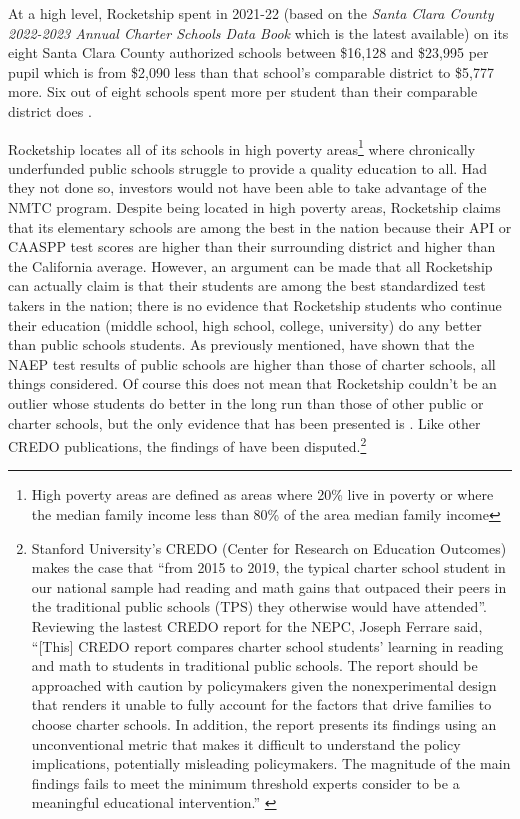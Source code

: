 At a high level, Rocketship spent in 2021-22 (based on the \textit{Santa Clara County 2022-2023 Annual Charter Schools Data Book} which is the latest available) on its eight Santa Clara County authorized schools between \$16,128 and \$23,995 per pupil which is from \$2,090 less than that school's comparable district to \$5,777 more. Six out of eight schools spent more per student than their comparable district does \parencite{SCCOE2014}.

Rocketship locates all of its schools in high poverty areas\footnote{High poverty areas are defined as areas where 20\% live in poverty or where the median family income less than 80\% of the area median family income\parencite[13-14]{CDFI2020}} where chronically underfunded public schools struggle to provide a quality education to all. Had they not done so, investors would not have been able to take advantage of the NMTC program. Despite being located in high poverty areas, Rocketship claims that its elementary schools are among the best in the nation \parencite{Abousalem2021} because their API or CAASPP test scores are higher than their surrounding district and higher than the California average. However, an argument can be made that all Rocketship can actually claim is that their students are among the best standardized test takers in the nation; there is no evidence that Rocketship students who continue their education (middle school, high school, college, university) do any better than public schools students. As previously mentioned, \textcite{Lubienski.Lubienski2014} have shown that the NAEP test results of public schools are higher than those of charter schools, all things considered. Of course this does not mean that Rocketship couldn't be an outlier whose students do better in the long run than those of other public or charter schools, but the only evidence that has been presented is \textcite{Raymond.etal2023}. Like other CREDO publications, the findings of \textcite{Raymond.etal2023} have been disputed.\footnote{Stanford University's CREDO (Center for Research on Education Outcomes) makes the case that ``from 2015 to 2019, the typical charter school student in our national sample had reading and math gains that outpaced their peers in the traditional public schools (TPS) they otherwise would have attended''. Reviewing the lastest CREDO report for the NEPC, Joseph Ferrare said, ``[This] CREDO report compares charter school students’ learning in reading and math to students in traditional public schools. The report should be approached with caution by policymakers given the nonexperimental design that renders it unable to fully account for the factors that drive families to choose charter schools. In addition, the report presents its findings using an unconventional metric that makes it difficult to understand the policy implications, potentially misleading policymakers. The magnitude of the main findings fails to meet the minimum threshold experts consider to be a meaningful educational intervention.'' \parencite{Ferrare2023}}


